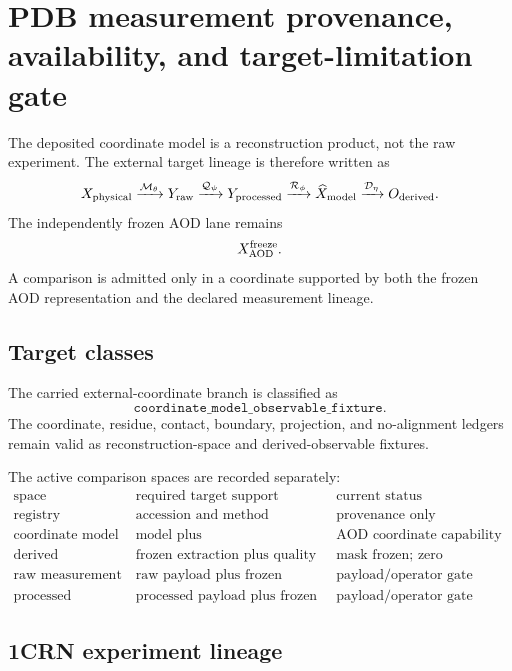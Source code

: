\section{PDB measurement provenance, availability, and target-limitation gate}
\label{sec:pdb-measurement-provenance-limitations}

The deposited coordinate model is a reconstruction product, not the raw
experiment.  The external target lineage is therefore written as
\[
X_{\rm physical}
\xrightarrow{\mathcal M_\theta}Y_{\rm raw}
\xrightarrow{\mathcal Q_\psi}Y_{\rm processed}
\xrightarrow{\mathcal R_\phi}\widehat X_{\rm model}
\xrightarrow{\mathcal D_\eta}O_{\rm derived}.
\]
The independently frozen AOD lane remains
\[
X_{\rm AOD}^{\rm freeze}.
\]
A comparison is admitted only in a coordinate supported by both the frozen AOD
representation and the declared measurement lineage.

\subsection{Target classes}

The carried external-coordinate branch is classified as
\[
\texttt{coordinate\_model\_observable\_fixture}.
\]
The coordinate, residue, contact, boundary, projection, and no-alignment
ledgers remain valid as reconstruction-space and derived-observable fixtures.

The active comparison spaces are recorded separately:
\[
\begin{array}{c|c|c}
\text{space} & \text{required target support} & \text{current status}\\ \hline
\text{registry} & \text{accession and method metadata} & \text{provenance only}\\
\text{coordinate model} & \text{model plus refinement/validation lineage} & \text{AOD coordinate capability unavailable}\\
\text{derived observable} & \text{frozen extraction plus quality mask} & \text{mask frozen; zero supported pairs}\\
\text{raw measurement} & \text{raw payload plus frozen operator} & \text{payload/operator gate pending}\\
\text{processed measurement} & \text{processed payload plus frozen operator} & \text{payload/operator gate pending}
\end{array}
\]

\subsection{1CRN experiment lineage}

